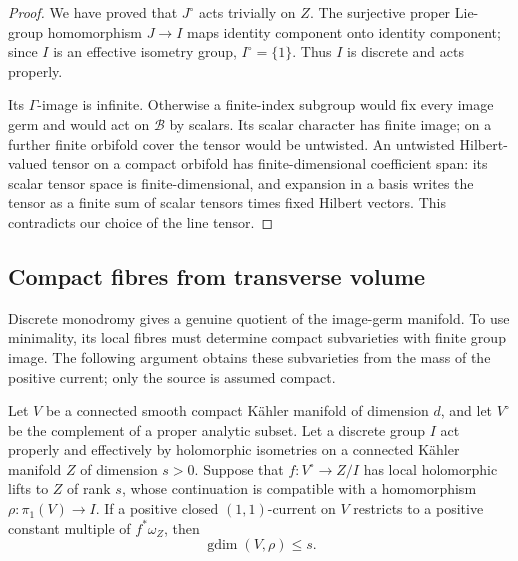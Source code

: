 \begin{proof}
We have proved that \(J^\circ\) acts trivially on \(Z\).
The surjective proper Lie-group homomorphism \(J\to I\) maps
identity component onto identity component; since \(I\) is an
effective isometry group, \(I^\circ=\{1\}\).
Thus \(I\) is discrete and acts properly.

Its \(\Gamma\)-image is infinite. Otherwise a finite-index subgroup
would fix every image germ and would act on \(\mathcal B\) by
scalars. Its scalar character has finite image; on a further finite
orbifold cover the tensor would be untwisted. An untwisted
Hilbert-valued tensor on a compact orbifold has finite-dimensional
coefficient span: its scalar tensor space is finite-dimensional,
and expansion in a basis writes the tensor as a finite sum of
scalar tensors times fixed Hilbert vectors. This contradicts our
choice of the line tensor.
\end{proof}

\subsection{Compact fibres from transverse volume}

Discrete monodromy gives a genuine quotient of the image-germ
manifold. To use minimality, its local fibres must determine compact
subvarieties with finite group image. The following argument obtains
these subvarieties from the mass of the positive current; only the
source is assumed compact.

\begin{lemma}\label{hi:compact-fibres}
Let \(V\) be a connected smooth compact K\"ahler manifold of
dimension \(d\), and let \(V^\circ\) be the complement of a proper
analytic subset. Let a discrete group \(I\) act properly and
effectively by holomorphic isometries on a connected K\"ahler
manifold \(Z\) of dimension \(s>0\).
Suppose that \(f:V^\circ\to Z/I\) has local holomorphic lifts to
\(Z\) of rank \(s\), whose continuation is compatible with a
homomorphism \(\rho:\pi_1(V)\to I\).
If a positive closed \((1,1)\)-current on \(V\) restricts to
a positive constant multiple of \(f^*\omega_Z\), then
\begin{equation}
 \operatorname{gdim}(V,\rho)\le s.
 \label{hi:gamma-upper-bound}
\end{equation}
\end{lemma}

